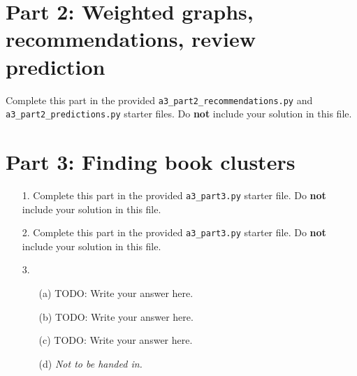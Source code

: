 \documentclass[11pt]{article}
\begin{document}
\section*{Part 2: Weighted graphs, recommendations, review prediction}

Complete this part in the provided \texttt{a3\_part2\_recommendations.py} and \texttt{a3\_part2\_predictions.py} starter files.
Do \textbf{not} include your solution in this file.

\newpage

\section*{Part 3: Finding book clusters}

\begin{enumerate}

\item[1.]
Complete this part in the provided \texttt{a3\_part3.py} starter file.
Do \textbf{not} include your solution in this file.

\item[2.]
Complete this part in the provided \texttt{a3\_part3.py} starter file.
Do \textbf{not} include your solution in this file.

\item[3.]

\begin{enumerate}
\item[(a)]
TODO: Write your answer here.

\item[(b)]
TODO: Write your answer here.

\item[(c)]
TODO: Write your answer here.

\item[(d)]
\emph{Not to be handed in.}
\end{enumerate}

\end{enumerate}
\end{document}
